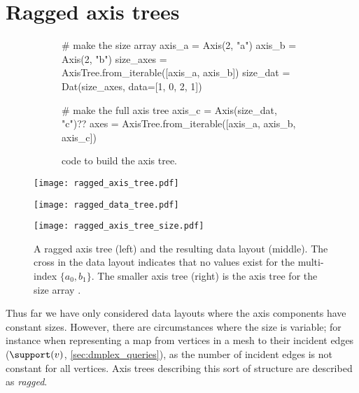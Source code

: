 \documentclass[thesis]{subfiles}
\begin{document}
\section{Ragged axis trees}
\label{sec:ragged_axis_trees}

\begin{figure}
  \centering
  \begin{subfigure}{.9\textwidth}
    \begin{pyalg2}
      # make the size array
      axis_a = Axis(2, "a")
      axis_b = Axis(2, "b")
      size_axes = AxisTree.from_iterable([axis_a, axis_b])
      size_dat = Dat(size_axes, data=[1, 0, 2, 1])

      # make the full axis tree
      axis_c = Axis(size_dat, "c")?\label{code:ragged_size_dat}?
      axes = AxisTree.from_iterable([axis_a, axis_b, axis_c])
    \end{pyalg2}
    \caption{ code to build the axis tree.}
  \end{subfigure}

  \vspace{1em}

  \begin{minipage}{.35\textwidth}
    \begin{center}
      \texttt{[image: ragged\_axis\_tree.pdf]}
    \end{center}
  \end{minipage}
  \begin{minipage}{.4\textwidth}
    \begin{center}
      \texttt{[image: ragged\_data\_tree.pdf]}
    \end{center}
  \end{minipage}
  \begin{minipage}{.2\textwidth}
    \begin{center}
      \texttt{[image: ragged\_axis\_tree\_size.pdf]}
    \end{center}
  \end{minipage}
  \caption{
    A ragged axis tree (left) and the resulting data layout (middle).
    The cross in the data layout indicates that no values exist for the multi-index $\{a_0, b_1\}$.
    The smaller axis tree (right) is the axis tree for the size array \pycode{[[1,0],[2,1]][?$i_a$?,?$i_b$?]}.
  }
  \label{fig:ragged_axis_tree}
\end{figure}

Thus far we have only considered data layouts where the axis components have constant sizes.
However, there are circumstances where the size is variable; for instance when representing a map from vertices in a mesh to their incident edges ($\support(v)$, \cref{sec:dmplex_queries}), as the number of incident edges is not constant for all vertices.
Axis trees describing this sort of structure are described as \emph{ragged}.
\end{document}
